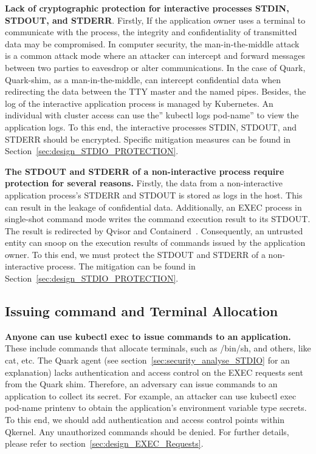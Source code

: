 \textbf{Lack of cryptographic protection for interactive processes STDIN, STDOUT, and STDERR}. Firstly, If the application owner uses a terminal to communicate with the process, the integrity and confidentiality of transmitted data may be compromised. In computer security, the man-in-the-middle 
attack~\cite*{Man_in_the_middle_attack} is a common attack mode where an attacker can intercept and forward messages between two parties to eavesdrop or alter communications. In the case of Quark,  Quark-shim, as a man-in-the-middle, can intercept confidential data when redirecting the data between the TTY master and the named 
pipes. Besides, the log of the interactive application process is managed by Kubernetes. An individual with cluster access can use the” kubectl logs pod-name” to view the application logs. To this end, the interactive processes STDIN, STDOUT, and STDERR should be encrypted. Specific mitigation measures can be 
found in  Section~\ref{sec:design_STDIO_PROTECTION}.
 
 
\textbf{The STDOUT and STDERR of a non-interactive process require protection for several reasons.} Firstly, the data from a non-interactive application process’s STDERR and STDOUT is stored as logs in the host. This can result in the leakage of confidential data. Additionally, an EXEC process in 
single-shot command mode writes the command execution result to its STDOUT. The result is redirected by Qvisor and Containerd~\cite*{containerd}. Consequently, an untrusted entity can snoop on the execution results of commands issued by the application owner. To this end, we must protect the STDOUT and STDERR of a non-interactive process. The mitigation can be found in  Section~\ref{sec:design_STDIO_PROTECTION}.


\subsection{Issuing command and Terminal Allocation}
\textbf{Anyone can use kubectl exec to issue commands to an application.} These include commands that allocate terminals, such as /bin/sh, and others, like cat, etc. The Quark agent (see section~\ref{sec:security_analyse_STDIO} for an explanation) lacks authentication and access control on the EXEC requests sent from the Quark shim. Therefore, an adversary can 
issue commands to an application to collect its secret. For example, an attacker can use kubectl exec pod-name printenv to obtain the application’s environment variable type secrets. To this end, we should add authentication and access control points within Qkernel. Any unauthorized commands should be denied. For further details, please refer to section~\ref{sec:design_EXEC_Requests}.



